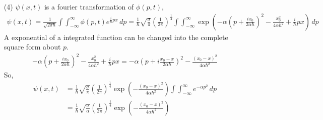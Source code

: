 \documentclass[aps,floatfix,nofootinbib,superscriptaddress,fleqn]{revtex4}
\begin{document}
\begin{itemize}
  \item[(4)] $\psi(x,t)$ is a fourier transformation of $\phi(p,t)$,
    \begin{align}
      \psi(x,t)=\frac{1}{\sqrt{2\pi\hbar}}\int\int_{-\infty}^{\infty}\phi(p,t) e^{\frac{i}{\hbar}px}\,dp
      =\frac{1}{\hbar} \sqrt{\frac{\sigma }{\pi}}{\left(\frac{1}{2\pi}\right)}^{\frac{1}{4}} \int\int_{-\infty}^{\infty} \exp\left(-\alpha{\left(p+\frac{ix_0}{2\alpha\hbar}\right)}^2 
      -\frac{x_0^2}{4\alpha\hbar^2}+\frac{i}{\hbar}px\right)\,dp
    \end{align} 
  A exponential of a integrated function can be changed into the complete square form about $p$.
    \begin{align}
      -\alpha{\left(p+\frac{ix_0}{2\alpha\hbar}\right)}^2 
      -\frac{x_0^2}{4\alpha\hbar^2}+\frac{i}{\hbar}px 
      = -\alpha{\left(p+i\frac{x_0-x}{2\alpha\hbar}\right)}^2
      -\frac{{(x_0-x)}^2}{4\alpha\hbar^2}
    \end{align}
  So,
    \begin{align}
      \psi(x,t)&=\frac{1}{\hbar} \sqrt{\frac{\sigma }{\pi}}{\left(\frac{1}{2\pi}\right)}^{\frac{1}{4}}\exp\left(-\frac{{(x_0-x)}^2}{4\alpha\hbar^2}\right)\int\int_{-\infty}^{\infty} e^{-\alpha p^2}\,dp
      \\&= \frac{1}{\hbar} \sqrt{\frac{\sigma }{\alpha}}{\left(\frac{1}{2\pi}\right)}^{\frac{1}{4}}\exp\left(-\frac{{(x_0-x)}^2}{4\alpha\hbar^2}\right)
    \end{align}


\end{itemize}
\end{document}
